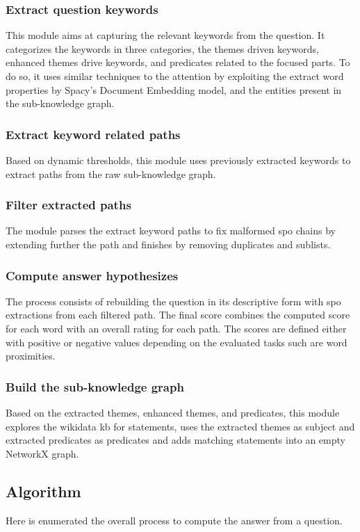 \subsubsection{Extract question keywords}
This module aims at capturing the relevant keywords from the question. It categorizes the keywords in three categories, the themes driven keywords, enhanced themes drive keywords, and predicates related to the focused parts. To do so, it uses similar techniques to the \gls{attention} by exploiting the extract word properties by Spacy's Document Embedding model, and the entities present in the sub-knowledge graph.

\subsubsection{Extract keyword related paths}
Based on dynamic thresholds, this module uses previously extracted keywords to extract paths from the raw sub-knowledge graph.

\subsubsection{Filter extracted paths}
The module parses the extract keyword paths to fix malformed \gls{spo} chains by extending further the path and finishes by removing duplicates and sublists.

\subsubsection{Compute answer hypothesizes}
The process consists of rebuilding the question in its descriptive form with \gls{spo} extractions from each filtered path. The final score combines the computed score for each word with an overall rating for each path. The scores are defined either with positive or negative values depending on the evaluated tasks such are word proximities.

\subsubsection{Build the sub-knowledge graph}
Based on the extracted themes, enhanced themes, and predicates, this module explores the \gls{wikidata} \gls{kb} for statements, uses the extracted themes as subject and extracted predicates as predicates and adds matching statements into an empty NetworkX graph.


\subsection{Algorithm}
Here is enumerated the overall process to compute the answer from a question.

